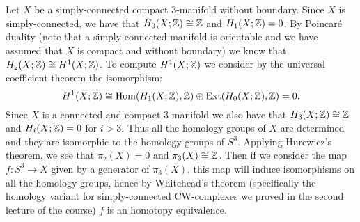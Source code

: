 \documentclass[a4paper,11pt,english]{article}
\begin{document}
\begin{exercise}[2]


Let $X$ be a simply-connected compact 3-manifold without boundary. Since $X$ is simply-connected, we have that $H_0(X;\mathbb{Z})\cong\mathbb{Z}$ and $H_1(X;\mathbb{Z})=0$. By Poincaré duality (note that a simply-connected manifold is orientable and we have assumed that $X$ is compact and without boundary) we know that $H_2(X;\mathbb{Z})\cong H^1(X;\mathbb{Z})$. To compute $H^1(X;\mathbb{Z})$ we consider by the universal coefficient theorem the isomorphism:
\[H^1(X;\mathbb{Z})\cong\operatorname{Hom}(H_1(X;\mathbb{Z}),\mathbb{Z})\oplus\operatorname{Ext}(H_0(X;\mathbb{Z}),\mathbb{Z})=0.\]
Since $X$ is a connected and compact 3-manifold we also have that $H_3(X;\mathbb{Z})\cong\mathbb{Z}$ and $H_i(X;\mathbb{Z})=0$ for $i>3$. Thus all the homology groups of $X$ are determined and they are isomorphic to the homology groups of $S^3$. Applying Hurewicz's theorem, we see that $\pi_2(X)=0$ and $\pi_3(X)\cong\mathbb{Z}$. Then if we consider the map $f:S^3\to X$ given by a generator of $\pi_3(X)$, this map will induce isomorphisms on all the homology groups, hence by Whitehead's theorem (specifically the homology variant for simply-connected CW-complexes we proved in the second lecture of the course) $f$ is an homotopy equivalence.

\end{exercise}
\end{document}
